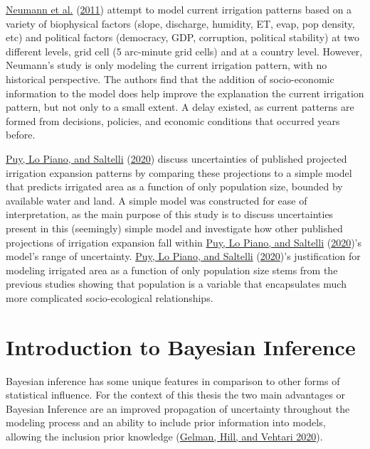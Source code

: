 \documentclass[12pt,twoside]{reedthesis}
\begin{document}
\protect\hyperlink{ref-neumannExploringGlobalIrrigation2011}{Neumann et al.} (\protect\hyperlink{ref-neumannExploringGlobalIrrigation2011}{2011}) attempt to model current irrigation patterns based on a variety of biophysical factors (slope, discharge, humidity, ET, evap, pop density, etc) and political factors (democracy, GDP, corruption, political stability) at two different levels, grid cell (5 arc-minute grid cells) and at a country level. However, Neumann's study is only modeling the current irrigation pattern, with no historical perspective. The authors find that the addition of socio-economic information to the model does help improve the explanation the current irrigation pattern, but not only to a small extent. A delay existed, as current patterns are formed from decisions, policies, and economic conditions that occurred years before.

\protect\hyperlink{ref-puyCurrentModelsUnderestimate2020}{Puy, Lo Piano, and Saltelli} (\protect\hyperlink{ref-puyCurrentModelsUnderestimate2020}{2020}) discuss uncertainties of published projected irrigation expansion patterns by comparing these projections to a simple model that predicts irrigated area as a function of only population size, bounded by available water and land. A simple model was constructed for ease of interpretation, as the main purpose of this study is to discuss uncertainties present in this (seemingly) simple model and investigate how other published projections of irrigation expansion fall within \protect\hyperlink{ref-puyCurrentModelsUnderestimate2020}{Puy, Lo Piano, and Saltelli} (\protect\hyperlink{ref-puyCurrentModelsUnderestimate2020}{2020})'s model's range of uncertainty. \protect\hyperlink{ref-puyCurrentModelsUnderestimate2020}{Puy, Lo Piano, and Saltelli} (\protect\hyperlink{ref-puyCurrentModelsUnderestimate2020}{2020})'s justification for modeling irrigated area as a function of only population size stems from the previous studies showing that population is a variable that encapsulates much more complicated socio-ecological relationships.

\hypertarget{bayesintro}{%
\section{Introduction to Bayesian Inference}\label{bayesintro}}

Bayesian inference has some unique features in comparison to other forms of statistical influence. For the context of this thesis the two main advantages or Bayesian Inference are an improved propagation of uncertainty throughout the modeling process and an ability to include prior information into models, allowing the inclusion prior knowledge (\protect\hyperlink{ref-gelman2020}{Gelman, Hill, and Vehtari 2020}).
\end{document}
